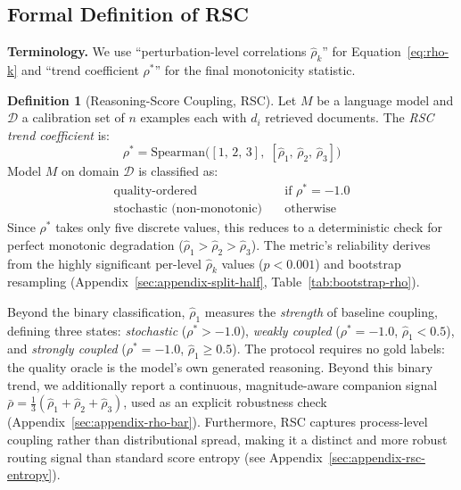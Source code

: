 \documentclass[11pt]{article}
\theoremstyle{definition}
\newtheorem{definition}{Definition}
\begin{document}
\subsection{Formal Definition of RSC}
\label{subsec:rsc-formal}

\noindent\textbf{Terminology.} We use ``perturbation-level correlations \(\hat{\rho}_k\)'' for Equation~\ref{eq:rho-k} and ``trend coefficient \(\rho^*\)'' for the final monotonicity statistic.

\begin{definition}[Reasoning-Score Coupling, RSC]
Let \(M\) be a language model and \(\mathcal{D}\) a calibration set of \(n\) examples each with \(d_i\) retrieved documents. The \emph{RSC trend coefficient} is:
\begin{equation}
  \rho^* = \text{Spearman}\bigl([1,\,2,\,3],\;[\hat{\rho}_1,\,\hat{\rho}_2,\,\hat{\rho}_3]\bigr)
  \label{eq:trend-rho}
\end{equation}
Model \(M\) on domain \(\mathcal{D}\) is classified as:
\begin{align*}
  \text{quality-ordered} &\quad \text{if } \rho^* = -1.0 \\
  \text{stochastic (non-monotonic)} &\quad \text{otherwise}
\end{align*}
Since \(\rho^*\) takes only five discrete values, this reduces to a deterministic check for perfect monotonic degradation (\(\hat{\rho}_1 > \hat{\rho}_2 > \hat{\rho}_3\)). The metric's reliability derives from the highly significant per-level \(\hat{\rho}_k\) values (\(p < 0.001\)) and bootstrap resampling (Appendix~\ref{sec:appendix-split-half}, Table~\ref{tab:bootstrap-rho}).
\end{definition}

\noindent Beyond the binary classification, \(\hat{\rho}_1\) measures the \emph{strength} of baseline coupling, defining three states: \emph{stochastic} (\(\rho^* > -1.0\)), \emph{weakly coupled} (\(\rho^* = -1.0\), \(\hat{\rho}_1 < 0.5\)), and \emph{strongly coupled} (\(\rho^* = -1.0\), \(\hat{\rho}_1 \geq 0.5\)). The protocol requires no gold labels: the quality oracle is the model's own generated reasoning. Beyond this binary trend, we additionally report a continuous, magnitude-aware companion signal \(\bar{\rho} = \tfrac{1}{3}(\hat{\rho}_1 + \hat{\rho}_2 + \hat{\rho}_3)\), used as an explicit robustness check (Appendix~\ref{sec:appendix-rho-bar}). Furthermore, RSC captures process-level coupling rather than distributional spread, making it a distinct and more robust routing signal than standard score entropy (see Appendix~\ref{sec:appendix-rsc-entropy}).
\end{document}
